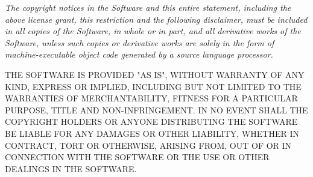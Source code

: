 \begin{addmargin}[1em]{2em}
\emph{
The copyright notices in the Software and this entire statement, including
the above license grant, this restriction and the following disclaimer,
must be included in all copies of the Software, in whole or in part, and
all derivative works of the Software, unless such copies or derivative
works are solely in the form of machine-executable object code generated by
a source language processor. \\
}
\end{addmargin}

THE SOFTWARE IS PROVIDED "AS IS", WITHOUT WARRANTY OF ANY KIND, EXPRESS OR
IMPLIED, INCLUDING BUT NOT LIMITED TO THE WARRANTIES OF MERCHANTABILITY,
FITNESS FOR A PARTICULAR PURPOSE, TITLE AND NON-INFRINGEMENT. IN NO EVENT
SHALL THE COPYRIGHT HOLDERS OR ANYONE DISTRIBUTING THE SOFTWARE BE LIABLE
FOR ANY DAMAGES OR OTHER LIABILITY, WHETHER IN CONTRACT, TORT OR OTHERWISE,
ARISING FROM, OUT OF OR IN CONNECTION WITH THE SOFTWARE OR THE USE OR OTHER
DEALINGS IN THE SOFTWARE.
